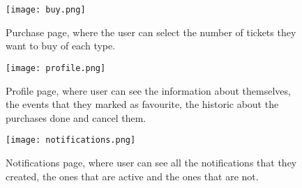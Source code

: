 \documentclass[screen,review]{acmart}
\begin{document}
\hspace{1cm}

\hspace{1cm}

    \begin{figure}[h!]
        \centering
        \texttt{[image: buy.png]}
        \caption{Purchase page, where the user can select the number of tickets they want to buy of each type.}
        \label{fig:buy}
    \end{figure}

\hspace{1cm}
\pagebreak
\hspace{1cm}

    \begin{figure}[h!]
        \centering
        \texttt{[image: profile.png]}
        \caption{Profile page, where user can see the information about themselves, the events that they marked as favourite, the historic about the purchases done and cancel them.}
        \label{fig:profile}
    \end{figure}

\hspace{1cm}

\hspace{1cm}

    \begin{figure}[h!]
        \centering
        \texttt{[image: notifications.png]}
        \caption{Notifications page, where user can see all the notifications that they created, the ones that are active and the ones that are not.}
        \label{fig:notification}
    \end{figure}

\hspace{1cm}
\pagebreak

\nocite{*}
\def\BibTex{BibTeX}


\end{document}

